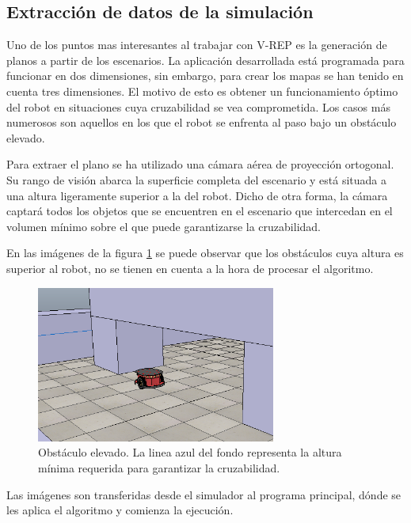 \subsection{Extracción de datos de la simulación}

Uno de los puntos mas interesantes al trabajar con V-REP es la generación de planos a partir de los escenarios. La aplicación desarrollada está programada para funcionar en dos dimensiones, sin embargo, para crear los mapas se han tenido en cuenta tres dimensiones. El motivo de esto es obtener un funcionamiento óptimo del robot en situaciones cuya cruzabilidad se vea comprometida. Los casos más numerosos son aquellos en los que el robot se enfrenta al paso bajo un obstáculo elevado. 

Para extraer el plano se ha utilizado una cámara aérea de proyección ortogonal. Su rango de visión abarca la superficie completa del escenario y está situada a una altura ligeramente superior a la del robot. Dicho de otra forma, la cámara captará todos los objetos que se encuentren en el escenario que intercedan en el volumen mínimo sobre el que puede garantizarse la cruzabilidad.

En las imágenes de la figura \ref{fig:tunel} se puede observar que los obstáculos cuya altura es superior al robot, no se tienen en cuenta a la hora de procesar el algoritmo.

	
\begin{figure}[h]
		\centering
        \includegraphics[width=0.7\textwidth]{images/tunel.png}
        \caption{Obstáculo elevado. La linea azul del fondo representa la altura mínima requerida para garantizar la cruzabilidad.}
        \label{fig:tunel}
\end{figure} 

Las imágenes son transferidas desde el simulador al programa principal, dónde se les aplica el algoritmo y comienza la ejecución.

